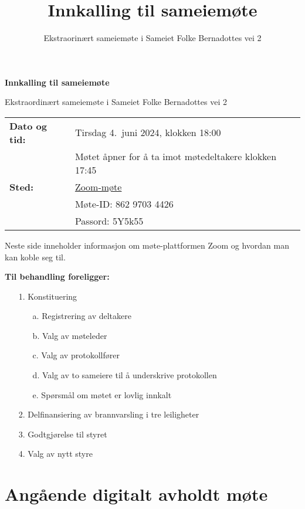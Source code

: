 \documentclass[12pt]{article}
\title{\LARGE\bf Innkalling til sameiemøte}
\author{Ekstraorinært sameiemøte i Sameiet Folke Bernadottes vei 2}
\date{}
\begin{document}
\begin{centering}
  {\LARGE\bf Innkalling til sameiemøte}

  \medskip

  {\large Ekstraordinært sameiemøte i Sameiet Folke Bernadottes vei 2}

\bigskip

\begin{tabular}{ll}
  {\bf Dato og tid:} & Tirsdag 4.\ juni 2024, klokken 18:00 \\
  & Møtet åpner for å ta imot møtedeltakere klokken 17:45
  \vspace{1ex}\\
  {\bf Sted:} & \href{https://us05web.zoom.us/j/86297034426?pwd=ffDzvL837fV5aNaDnQprRRzVqm4z8Q.1}{Zoom-møte}\\
  & Møte-ID: 862 9703 4426 \\
  & Passord: 5Y5k55
\end{tabular}
\end{centering}

\bigskip

Neste side inneholder informasjon om møte-plattformen Zoom og hvordan man kan koble seg til.\bigskip

{\bf Til behandling foreligger:}
\begin{enumerate}[topsep=3pt,itemsep=3pt,partopsep=3pt, parsep=3pt]
\item[1.] Konstituering
  \begin{enumerate}[topsep=3pt,itemsep=3pt,partopsep=3pt, parsep=3pt]
    \item[a.] Registrering av deltakere
    \item[b.] Valg av møteleder
    \item[c.] Valg av protokollfører
    \item[d.] Valg av to sameiere til å underskrive protokollen
    \item[e.] Spørsmål om møtet er lovlig innkalt
  \end{enumerate}
\item[2.] Delfinansiering av brannvarsling i tre leiligheter
\item[3.] Godtgjørelse til styret
\item[4.] Valg av nytt styre
\end{enumerate}

\section*{Angående digitalt avholdt møte}
\end{document}
